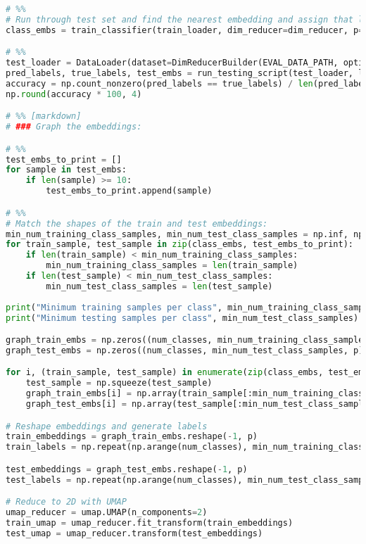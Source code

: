 \documentclass{article}
\begin{document}
\begin{lstlisting}[language=Python]
# %%
# Run through test set and find the nearest embedding and assign that label to the image
class_embs = train_classifier(train_loader, dim_reducer=dim_reducer, p=p, num_classes=num_classes, lda_proj_mat=lda_proj_mat)

# %%
test_loader = DataLoader(dataset=DimReducerBuilder(EVAL_DATA_PATH, option="bw"), batch_size=batch_size, shuffle=False)
pred_labels, true_labels, test_embs = run_testing_script(test_loader, lda_proj_mat, class_embs, dim_reducer=dim_reducer)
accuracy = np.count_nonzero(pred_labels == true_labels) / len(pred_labels)
np.round(accuracy * 100, 4)

# %% [markdown]
# ### Graph the embeddings:

# %%
test_embs_to_print = []
for sample in test_embs:
    if len(sample) >= 10:
        test_embs_to_print.append(sample)

# %%
# Match the shapes of the train and test embeddings:
min_num_training_class_samples, min_num_test_class_samples = np.inf, np.inf
for train_sample, test_sample in zip(class_embs, test_embs_to_print):
    if len(train_sample) < min_num_training_class_samples:
        min_num_training_class_samples = len(train_sample)
    if len(test_sample) < min_num_test_class_samples:
        min_num_test_class_samples = len(test_sample)
        
print("Minimum training samples per class", min_num_training_class_samples)
print("Minimum testing samples per class", min_num_test_class_samples)        

graph_train_embs = np.zeros((num_classes, min_num_training_class_samples, p))
graph_test_embs = np.zeros((num_classes, min_num_test_class_samples, p))

for i, (train_sample, test_sample) in enumerate(zip(class_embs, test_embs_to_print)):
    test_sample = np.squeeze(test_sample)
    graph_train_embs[i] = np.array(train_sample[:min_num_training_class_samples], dtype=np.float32)
    graph_test_embs[i] = np.array(test_sample[:min_num_test_class_samples], dtype=np.float32)

# Reshape embeddings and generate labels
train_embeddings = graph_train_embs.reshape(-1, p)
train_labels = np.repeat(np.arange(num_classes), min_num_training_class_samples)

test_embeddings = graph_test_embs.reshape(-1, p)
test_labels = np.repeat(np.arange(num_classes), min_num_test_class_samples)

# Reduce to 2D with UMAP
umap_reducer = umap.UMAP(n_components=2)
train_umap = umap_reducer.fit_transform(train_embeddings)
test_umap = umap_reducer.transform(test_embeddings)



\end{lstlisting}
\end{document}
